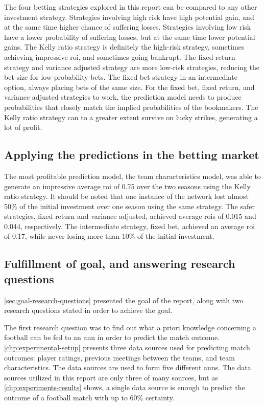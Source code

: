The four betting strategies explored in this report can be compared to any other investment strategy. Strategies involving high risk have high potential gain, and at the same time higher chance of suffering losses. Strategies involving low risk have a lower probability of suffering losses, but at the same time lower potential gains. The Kelly ratio strategy is definitely the high-risk strategy, sometimes achieving impressive \gls{roi}, and sometimes going bankrupt. The fixed return strategy and variance adjusted strategy are more low-risk strategies, reducing the bet size for low-probability bets. The fixed bet strategy in an intermediate option, always placing bets of the same size. For the fixed bet, fixed return, and variance adjusted strategies to work, the prediction model needs to produce probabilities that closely match the implied probabilities of the bookmakers. The Kelly ratio strategy can to a greater extent survive on lucky strikes, generating a lot of profit.


\subsection{Applying the predictions in the betting market}

The most profitable prediction model, the team characteristics model, was able to generate an impressive average \gls{roi} of 0.75 over the two seasons using the Kelly ratio strategy. It should be noted that one instance of the network lost almost 50\% of the initial investment over one season using the same strategy. The safer strategies, fixed return and variance adjusted, achieved average \glspl{roi} of 0.015 and 0.044, respectively. The intermediate strategy, fixed bet, achieved an average \gls{roi} of 0.17, while never losing more than 10\% of the initial investment.


\subsection{Fulfillment of goal, and answering research questions}

\cref{sec:goal-research-questions} presented the goal of the report, along with two research questions stated in order to achieve the goal.

The first research question was to find out what a priori knowledge concerning a football can be fed to an \gls{ann} in order to predict the match outcome. \cref{chp:experimental-setup} presents three data sources used for predicting match outcomes: player ratings, previous meetings between the teams, and team characteristics. The data sources are used to form five different \glspl{ann}. The data sources utilized in this report are only three of many sources, but as \cref{chp:experiments-results} shows, a single data source is enough to predict the outcome of a football match with up to 60\% certainty.
    
